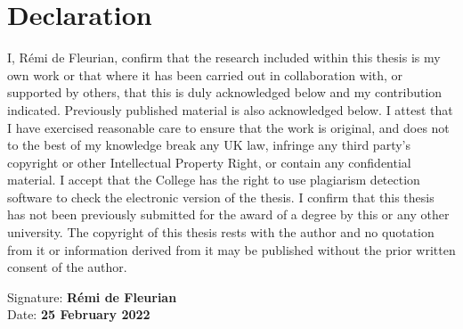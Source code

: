 
\chapter*{Declaration}
\setcounter{page}{2}

I, Rémi de Fleurian, confirm that the research included within this thesis is my own work or that where it has been carried out in collaboration with, or supported by others, that this is duly acknowledged below and my contribution indicated. Previously published material is also acknowledged below. I attest that I have exercised reasonable care to ensure that the work is original, and does not to the best of my knowledge break any UK law, infringe any third party's copyright or other Intellectual Property Right, or contain any confidential material. I accept that the College has the right to use plagiarism detection software to check the electronic version of the thesis. I confirm that this thesis has not been previously submitted for the award of a degree by this or any other university. The copyright of this thesis rests with the author and no quotation from it or information derived from it may be published without the prior written consent of the author. \\

\begin{raggedright}
Signature: \textbf{Rémi de Fleurian} \\
Date: \textbf{25 February 2022}
\end{raggedright}